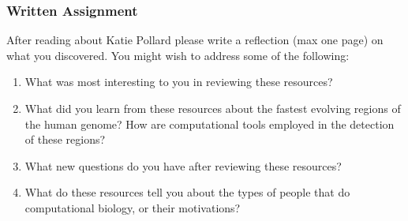 \documentclass{article}
\begin{document}
\subsubsection*{Written Assignment} 
After reading about Katie Pollard please write a reflection (max one page) on what you discovered. You might wish to address some of the following: 

\begin{enumerate}
\item What was most interesting to you in reviewing these resources?
\item What did you learn from these resources about the fastest evolving regions of the human genome? How are computational tools employed in the detection of these regions?
\item What new questions do you have after reviewing these resources?
\item What do these resources tell you about the types of people that do computational biology, or their motivations?
\end{enumerate}

\EndAccSupp{}
\end{document}
